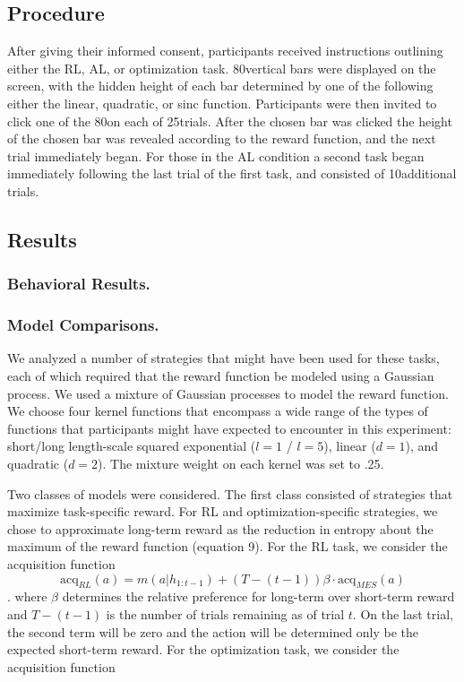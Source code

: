 \documentclass[10pt,letterpaper]{article}
\def\numtrials{25}
\def\numtrialsminerror{10}
\def\numbars{80}
\begin{document}
	\subsection{Procedure}
	
	After giving their informed consent, participants received instructions outlining either the RL, AL, or optimization task. \numbars \space vertical bars were displayed on the screen, with the hidden height of each bar determined by one of the following either the linear, quadratic, or sinc function. Participants were then invited to click one of the \numbars \space on each of \numtrials \space trials. After the chosen bar was clicked the height of the chosen bar was revealed according to the reward function, and the next trial immediately began. For those in the AL condition a second task began immediately following the last trial of the first task, and consisted of \numtrialsminerror \space additional trials.
	
	\subsection{Results}
	
	\subsubsection{Behavioral Results.}
	
	\subsubsection{Model Comparisons.}
	
	We analyzed a number of strategies that might have been used for these tasks, each of which required that the reward function be modeled using a Gaussian process. We used a mixture of Gaussian processes \citep{Tresp} to model the reward function. We choose four kernel functions that encompass a wide range of the types of functions that participants might have expected to encounter in this experiment: short/long length-scale squared exponential ($l = 1$ / $l = 5$), linear ($d = 1$), and quadratic ($d = 2$). The mixture weight on each kernel was set to .25.
	
	Two classes of models were considered. The first class consisted of strategies that maximize task-specific reward. For RL and optimization-specific strategies, we chose to approximate long-term reward as the reduction in entropy about the maximum of the reward function (equation 9). For the RL task, we consider the acquisition function
	$$\text{acq}_{RL}(a)  = m(a|h_{1:t-1}) + (T-(t-1))\beta \cdot \text{acq}_{MES}(a)$$.
	where $\beta$ determines the relative preference for long-term over short-term reward and $T-(t-1)$ is the number of trials remaining as of trial $t$. On the last trial, the second term will be zero and the action will be determined only be the expected short-term reward. For the optimization task, we consider the acquisition function
\end{document}
